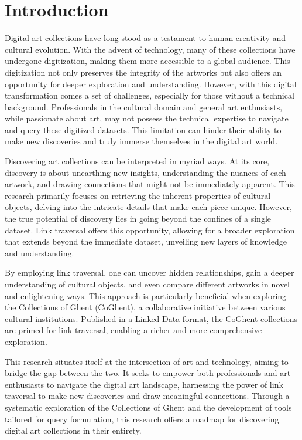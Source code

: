 \chapter*{Introduction}

Digital art collections have long stood as a testament to human creativity and cultural evolution. With the advent of technology, many of these collections have undergone digitization, making them more accessible to a global audience. This digitization not only preserves the integrity of the artworks but also offers an opportunity for deeper exploration and understanding. However, with this digital transformation comes a set of challenges, especially for those without a technical background. Professionals in the cultural domain and general art enthusiasts, while passionate about art, may not possess the technical expertise to navigate and query these digitized datasets. This limitation can hinder their ability to make new discoveries and truly immerse themselves in the digital art world.

Discovering art collections can be interpreted in myriad ways. At its core, discovery is about unearthing new insights, understanding the nuances of each artwork, and drawing connections that might not be immediately apparent. This research primarily focuses on retrieving the inherent properties of cultural objects, delving into the intricate details that make each piece unique. However, the true potential of discovery lies in going beyond the confines of a single dataset. Link traversal offers this opportunity, allowing for a broader exploration that extends beyond the immediate dataset, unveiling new layers of knowledge and understanding.

By employing link traversal, one can uncover hidden relationships, gain a deeper understanding of cultural objects, and even compare different artworks in novel and enlightening ways. This approach is particularly beneficial when exploring the Collections of Ghent (CoGhent), a collaborative initiative between various cultural institutions. Published in a Linked Data format, the CoGhent collections are primed for link traversal, enabling a richer and more comprehensive exploration.

This research situates itself at the intersection of art and technology, aiming to bridge the gap between the two. It seeks to empower both professionals and art enthusiasts to navigate the digital art landscape, harnessing the power of link traversal to make new discoveries and draw meaningful connections. Through a systematic exploration of the Collections of Ghent and the development of tools tailored for query formulation, this research offers a roadmap for discovering digital art collections in their entirety.

